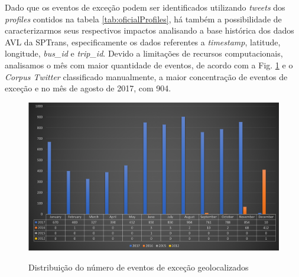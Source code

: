 \documentclass[
	12pt,				%
	oneside,			%
	a4paper,			%
	english,			%
	brazil				%
	]{abntex2ppgsi}
\begin{document}
Dado que os eventos de exceção podem ser identificados utilizando \textit{tweets} dos \textit{profiles} contidos na tabela \ref{tab:oficialProfiles}, há também a possibilidade de caracterizarmos seus respectivos impactos analisando a base histórica dos dados AVL da SPTrans, especificamente os dados referentes a \textit{timestamp}, latitude, longitude, \textit{bus\_id} e \textit{trip\_id}.  Devido a limitações de recursos computacionais, analisamos o mês com maior quantidade de eventos, de acordo com a Fig. \ref{fig:geolocated_exception_events_distribution} e o \textit{Corpus Twitter} classificado manualmente, a maior concentração de eventos de exceção e no mês de agosto de 2017, com 904.



\begin{figure}[!htb]
	\centering
 	  \caption{Distribuição do número de eventos de exceção geolocalizados}
		\includegraphics[width=1\linewidth]{images/geolocated_exception_events_distribution.png}
	\label{fig:geolocated_exception_events_distribution}
\end{figure}
\end{document}
